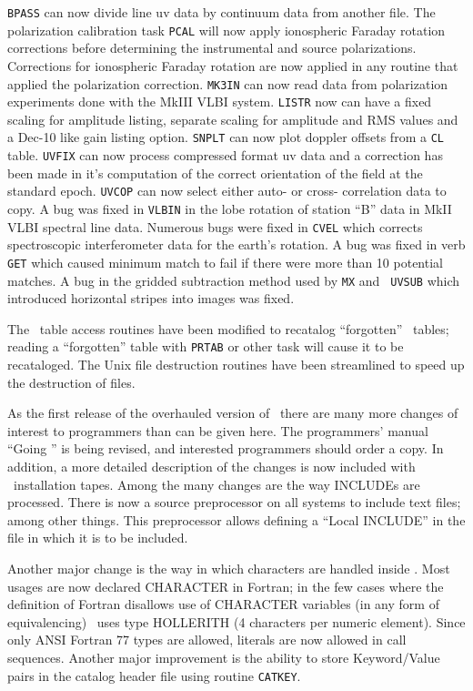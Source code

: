 {\tt BPASS} can now divide line uv data by continuum data from another file.
The polarization calibration task {\tt PCAL} will now apply ionospheric
Faraday rotation corrections before determining the instrumental and
source polarizations.
Corrections for ionospheric Faraday rotation are now applied in any
routine that applied the polarization correction.
{\tt MK3IN} can now read data from polarization experiments done with the
MkIII VLBI system.
{\tt LISTR} now can have a fixed scaling for amplitude listing, separate
scaling for amplitude and RMS values and a Dec-10 like gain listing
option.
{\tt SNPLT} can now plot doppler offsets from a {\tt CL} table.
{\tt UVFIX} can now process compressed format uv data and a correction has
been made in it's computation of the correct orientation of the field
at the standard epoch.
{\tt UVCOP} can now select either auto- or cross- correlation data to copy.
A bug was fixed in {\tt VLBIN} in the lobe rotation of station ``B'' data in
MkII VLBI spectral line data.
Numerous bugs were fixed in {\tt CVEL} which corrects spectroscopic
interferometer data for the earth's rotation.
A bug was fixed in verb {\tt GET} which caused minimum match to fail if
there were more than 10 potential matches.
A bug in the gridded subtraction method used by {\tt MX} and {\tt
UVSUB} which introduced horizontal stripes into images was fixed.

The \AIPS\ table access routines have been modified to recatalog
``forgotten'' \AIPS\ tables; reading a ``forgotten'' table with {\tt PRTAB}
or other task will cause it to be recataloged.
The Unix file destruction routines have been streamlined to speed up
the destruction of files.


     As the first release of the overhauled version of \AIPS\ there
are many more changes of interest to programmers than can be given
here.  The programmers' manual ``Going \AIPS '' is being revised, and
interested programmers should order a copy.  In addition, a more
detailed description of the changes is now included with \AIPS\
installation tapes.  Among the many changes are the way INCLUDEs are
processed.  There is now a source preprocessor on all systems to
include text files; among other things.  This preprocessor allows
defining a ``Local INCLUDE'' in the file in which it is to be
included.

     Another major change is the way in which characters are handled
inside \AIPS.  Most usages are now declared CHARACTER in Fortran;
in the few cases where the definition of Fortran disallows use of
CHARACTER variables (in any form of equivalencing) \AIPS\ uses type
HOLLERITH (4 characters per numeric element).  Since only ANSI Fortran
77 types are allowed, literals are now allowed in call sequences.
Another major improvement is the ability to store Keyword/Value pairs
in the catalog header file using routine {\tt CATKEY}.

